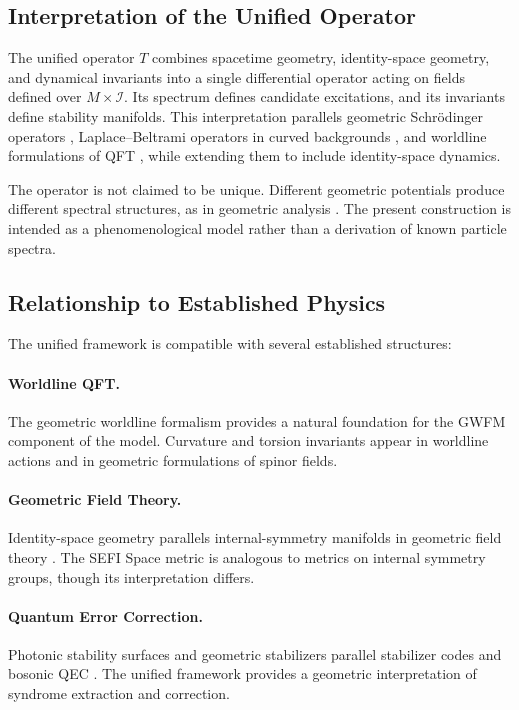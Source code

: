 \documentclass[aip,jmp,reprint,onecolumn,nofootinbib]{revtex4-2}
\begin{document}
\subsection{Interpretation of the Unified Operator}

The unified operator $T$ combines spacetime geometry, identity-space geometry, and 
dynamical invariants into a single differential operator acting on fields defined over 
$M \times \mathcal{I}$. Its spectrum defines candidate excitations, and its invariants define 
stability manifolds. This interpretation parallels geometric Schrödinger operators 
\cite{Helffer}, Laplace–Beltrami operators in curved backgrounds \cite{RosenbergLaplace}, 
and worldline formulations of QFT \cite{Polyakov1987,Schubert2001}, while extending them 
to include identity-space dynamics.

The operator is not claimed to be unique. Different geometric potentials produce different 
spectral structures, as in geometric analysis \cite{Helffer}. The present construction is 
intended as a phenomenological model rather than a derivation of known particle spectra.

\subsection{Relationship to Established Physics}

The unified framework is compatible with several established structures:

\paragraph{Worldline QFT.}
The geometric worldline formalism \cite{Feynman1950,Polyakov1987,Strassler1992} provides 
a natural foundation for the GWFM component of the model. Curvature and torsion invariants 
appear in worldline actions and in geometric formulations of spinor fields.

\paragraph{Geometric Field Theory.}
Identity-space geometry parallels internal-symmetry manifolds in geometric field theory 
\cite{Nakahara,Frankel}. The SEFI Space metric is analogous to metrics on internal 
symmetry groups, though its interpretation differs.

\paragraph{Quantum Error Correction.}
Photonic stability surfaces and geometric stabilizers parallel stabilizer codes 
\cite{GottesmanQEC} and bosonic QEC \cite{PreskillQEC,NohGirvinQEC}. The unified 
framework provides a geometric interpretation of syndrome extraction and correction.
\end{document}
